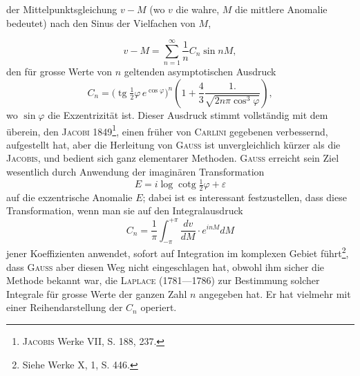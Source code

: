 der Mittelpunktsgleichung \(v-M\) (wo \(v\) die wahre, \(M\) die mittlere Anomalie
bedeutet) nach den Sinus der Vielfachen von \(M\),\par
\HistoricalFoot{}{15\textsuperscript{*}}
\clearpage{}
\[
v-M=\sum_{n=1}^{\infty}\frac1n C_n\sin nM,
\]
\noindent den für grosse Werte von \(n\) geltenden asymptotischen Ausdruck
\[
C_n=\bigl(\operatorname{tg}\tfrac12\varphi\,e^{\cos\varphi}\bigr)^n
\left(1+\frac43\frac{1.}{\sqrt{2n\pi\cos^3\varphi}}\right),
\]
wo \(\sin\varphi\) die Exzentrizität ist. Dieser Ausdruck stimmt vollständig mit dem
überein, den \textsc{Jacobi} 1849\footnote{\textsc{Jacobis} Werke VII, S. 188, 237.}, einen früher von \textsc{Carlini} gegebenen verbessernd,
aufgestellt hat, aber die Herleitung von \textsc{Gauss} ist unvergleichlich kürzer als
die \textsc{Jacobis}, und bedient sich ganz elementarer Methoden. \textsc{Gauss} erreicht
sein Ziel wesentlich durch Anwendung der imaginären Transformation
\[
E=i\log\operatorname{cotg}\tfrac12\varphi+\varepsilon
\]
auf die exzentrische Anomalie \(E\); dabei ist es interessant festzustellen, dass
diese Transformation, wenn man sie auf den Integralausdruck
\[
C_n=\frac1\pi\int_{-\pi}^{+\pi}\frac{dv}{dM}\cdot e^{inM}dM
\]
jener Koeffizienten anwendet, sofort auf Integration im komplexen Gebiet
führt\footnote{Siehe Werke X, 1, S. 446.}, dass \textsc{Gauss} aber diesen Weg nicht eingeschlagen hat, obwohl ihm
sicher die Methode bekannt war, die \textsc{Laplace} (1781—1786) zur Bestimmung
solcher Integrale für grosse Werte der ganzen Zahl \(n\) angegeben hat. Er
hat vielmehr mit einer Reihendarstellung der \(C_n\) operiert.

